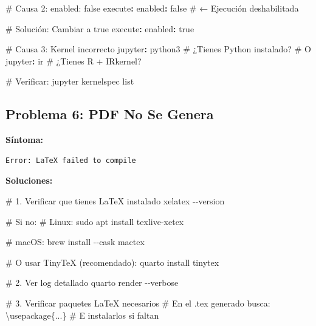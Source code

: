 \documentclass[
  doc,
  floatsintext,
  longtable,
  a4paper,
  nolmodern,
  notxfonts,
  notimes,
  12pt,
  colorlinks=true,linkcolor=blue,citecolor=blue,urlcolor=blue]{apa7}
\newenvironment{Shaded}{\begin{snugshade}}{\end{snugshade}}
\newcommand{\AttributeTok}[1]{\textcolor[rgb]{0.40,0.45,0.13}{#1}}
\newcommand{\CharTok}[1]{\textcolor[rgb]{0.13,0.47,0.30}{#1}}
\newcommand{\CommentTok}[1]{\textcolor[rgb]{0.37,0.37,0.37}{#1}}
\newcommand{\ExtensionTok}[1]{\textcolor[rgb]{0.00,0.23,0.31}{#1}}
\newcommand{\FunctionTok}[1]{\textcolor[rgb]{0.28,0.35,0.67}{#1}}
\newcommand{\KeywordTok}[1]{\textcolor[rgb]{0.00,0.23,0.31}{\textbf{#1}}}
\newcommand{\NormalTok}[1]{\textcolor[rgb]{0.00,0.23,0.31}{#1}}
\begin{document}
\begin{Shaded}
\begin{Highlighting}[]
\CommentTok{\# Causa 2: enabled: false}
\FunctionTok{execute}\KeywordTok{:}
\AttributeTok{  }\FunctionTok{enabled}\KeywordTok{:}\AttributeTok{ }\CharTok{false}\CommentTok{      \# ← Ejecución deshabilitada}

\CommentTok{\# Solución: Cambiar a true}
\FunctionTok{execute}\KeywordTok{:}
\AttributeTok{  }\FunctionTok{enabled}\KeywordTok{:}\AttributeTok{ }\CharTok{true}
\end{Highlighting}
\end{Shaded}

\begin{Shaded}
\begin{Highlighting}[]
\CommentTok{\# Causa 3: Kernel incorrecto}
\FunctionTok{jupyter}\KeywordTok{:}\AttributeTok{ python3}\CommentTok{      \# ¿Tienes Python instalado?}
\CommentTok{\# O}
\FunctionTok{jupyter}\KeywordTok{:}\AttributeTok{ ir}\CommentTok{          \# ¿Tienes R + IRkernel?}

\CommentTok{\# Verificar:}
\AttributeTok{jupyter kernelspec list}
\end{Highlighting}
\end{Shaded}

\subsection{Problema 6: PDF No Se
Genera}\label{problema-6-pdf-no-se-genera}

\textbf{Síntoma:}

\begin{verbatim}
Error: LaTeX failed to compile
\end{verbatim}

\textbf{Soluciones:}

\begin{Shaded}
\begin{Highlighting}[]
\CommentTok{\# 1. Verificar que tienes LaTeX instalado}
\ExtensionTok{xelatex} \AttributeTok{{-}{-}version}

\CommentTok{\# Si no:}
\CommentTok{\# Linux:}
\FunctionTok{sudo}\NormalTok{ apt install texlive{-}xetex}

\CommentTok{\# macOS:}
\ExtensionTok{brew}\NormalTok{ install }\AttributeTok{{-}{-}cask}\NormalTok{ mactex}

\CommentTok{\# O usar TinyTeX (recomendado):}
\ExtensionTok{quarto}\NormalTok{ install tinytex}

\CommentTok{\# 2. Ver log detallado}
\ExtensionTok{quarto}\NormalTok{ render }\AttributeTok{{-}{-}verbose}

\CommentTok{\# 3. Verificar paquetes LaTeX necesarios}
\CommentTok{\# En el .tex generado busca:}
\ExtensionTok{\textbackslash{}usepackage\{...\}}
\CommentTok{\# E instalarlos si faltan}
\end{Highlighting}
\end{Shaded}
\end{document}
